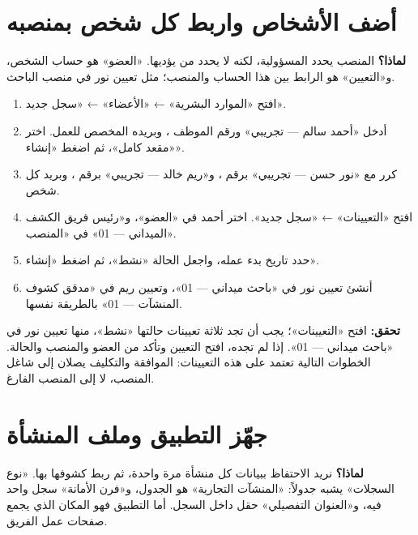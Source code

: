 \section{أضف الأشخاص واربط كل شخص بمنصبه}
\label{sec:build-members}

\textbf{لماذا؟} المنصب يحدد المسؤولية، لكنه لا يحدد من يؤديها. «العضو» هو حساب الشخص، و«التعيين» هو الرابط بين هذا الحساب والمنصب؛ مثل تعيين نور في منصب الباحث.

\begin{enumerate}
\item افتح «الموارد البشرية» ← «الأعضاء» ← «سجل جديد».
\item أدخل «أحمد سالم — تجريبي» ورقم الموظف ، وبريده المخصص للعمل. اختر «مقعد كامل»، ثم اضغط «إنشاء».
\item كرر مع «نور حسن — تجريبي» برقم ، و«ريم خالد — تجريبي» برقم ، وبريد كل شخص.
\item افتح «التعيينات» ← «سجل جديد». اختر أحمد في «العضو»، و«رئيس فريق الكشف الميداني — 01» في «المنصب».
\item حدد تاريخ بدء عمله، واجعل الحالة «نشط»، ثم اضغط «إنشاء».
\item أنشئ تعيين نور في «باحث ميداني — 01»، وتعيين ريم في «مدقق كشوف المنشآت — 01» بالطريقة نفسها.
\end{enumerate}

\textbf{تحقق:} افتح «التعيينات»؛ يجب أن تجد ثلاثة تعيينات حالتها «نشط»، منها تعيين نور في «باحث ميداني — 01». إذا لم تجده، افتح التعيين وتأكد من العضو والمنصب والحالة. الخطوات التالية تعتمد على هذه التعيينات: الموافقة والتكليف يصلان إلى شاغل المنصب، لا إلى المنصب الفارغ.

\section{جهّز التطبيق وملف المنشأة}
\label{sec:build-entity}

\textbf{لماذا؟} نريد الاحتفاظ ببيانات كل منشأة مرة واحدة، ثم ربط كشوفها بها. «نوع السجلات» يشبه جدولاً: «المنشآت التجارية» هو الجدول، و«فرن الأمانة» سجل واحد فيه، و«العنوان التفصيلي» حقل داخل السجل. أما التطبيق فهو المكان الذي يجمع صفحات عمل الفريق.

